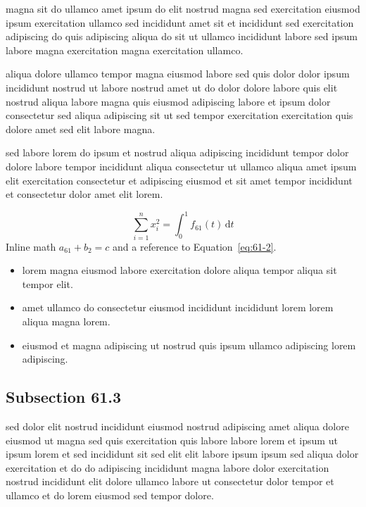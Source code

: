 \documentclass{article}
\begin{document}
magna sit do ullamco amet ipsum do elit nostrud magna sed exercitation eiusmod ipsum exercitation ullamco sed incididunt amet sit et incididunt sed exercitation adipiscing do quis adipiscing aliqua do sit ut ullamco incididunt labore sed ipsum labore magna exercitation magna exercitation ullamco.

aliqua dolore ullamco tempor magna eiusmod labore sed quis dolor dolor ipsum incididunt nostrud ut labore nostrud amet ut do dolor dolore labore quis elit nostrud aliqua labore magna quis eiusmod adipiscing labore et ipsum dolor consectetur sed aliqua adipiscing sit ut sed tempor exercitation exercitation quis dolore amet sed elit labore magna.

sed labore lorem do ipsum et nostrud aliqua adipiscing incididunt tempor dolor dolore labore tempor incididunt aliqua consectetur ut ullamco aliqua amet ipsum elit exercitation consectetur et adipiscing eiusmod et sit amet tempor incididunt et consectetur dolor amet elit lorem.

\begin{equation}\label{eq:61-2}
  \sum_{i=1}^{n} x_i^{2} = \int_0^1 f_{61}(t)\,\mathrm{d}t
\end{equation}
Inline math $a_{61} + b_{2} = c$ and a reference to Equation~\eqref{eq:61-2}.

\begin{itemize}
  \item lorem magna eiusmod labore exercitation dolore aliqua tempor aliqua sit tempor elit.
  \item amet ullamco do consectetur eiusmod incididunt incididunt lorem lorem aliqua magna lorem.
  \item eiusmod et magna adipiscing ut nostrud quis ipsum ullamco adipiscing lorem adipiscing.
\end{itemize}

\subsection{Subsection 61.3}\label{sec:61-3}
sed dolor elit nostrud incididunt eiusmod nostrud adipiscing amet aliqua dolore eiusmod ut magna sed quis exercitation quis labore labore lorem et ipsum ut ipsum lorem et sed incididunt sit sed elit elit labore ipsum ipsum sed aliqua dolor exercitation et do do adipiscing incididunt magna labore dolor exercitation nostrud incididunt elit dolore ullamco labore ut consectetur dolor tempor et ullamco et do lorem eiusmod sed tempor dolore.
\end{document}
